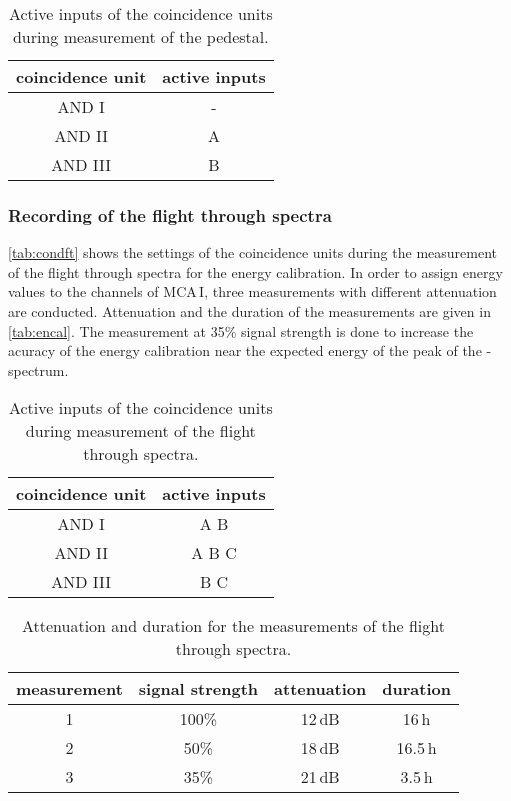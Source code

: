 \begin{table}[H]
\caption{Active inputs of the coincidence units during measurement of the pedestal.}
\begin{center}
\begin{tabular}{|c|c|}
  \hline
  coincidence unit	& active inputs	\\ \hline\hline
  AND I				& -				\\ \hline
  AND II			& A				\\ \hline
  AND III			& B				\\ \hline
 \end{tabular}
\end{center}
\label{tab:condped}
\end{table}

\subsubsection{Recording of the flight through spectra}
\autoref{tab:condft} shows the settings of the coincidence units during the measurement of the flight through spectra
for the energy calibration.
In order to assign energy values to the channels of MCA\,I,
three measurements with different attenuation are conducted.
Attenuation and the duration of the measurements are given in \autoref{tab:encal}.
The measurement at 35\% signal strength is done to increase the acuracy of the energy calibration near
the expected energy of the peak of the \textbeta-spectrum.

\begin{table}[H]
\caption{Active inputs of the coincidence units during measurement of the flight through spectra.}
\begin{center}
\begin{tabular}{|c|c|}
  \hline
  coincidence unit	& active inputs	\\ \hline\hline
  AND I				& A B			\\ \hline
  AND II			& A	B C			\\ \hline
  AND III			& B	C			\\ \hline
 \end{tabular}
\end{center}
\label{tab:condft}
\end{table}
\begin{table}[H]
\caption{Attenuation and duration for the measurements of the flight through spectra.}
\begin{center}
\begin{tabular}{|c|c|c|c|}
  \hline
  measurement	& signal strength	& attenuation	& duration	\\ \hline\hline
  1				& 100\%				& 12\,dB		& 16\,h		\\ \hline
  2				& 50\%				& 18\,dB		& 16.5\,h	\\ \hline
  3				& 35\%				& 21\,dB		& 3.5\,h	\\ \hline
 \end{tabular}
\end{center}
\label{tab:encal}
\end{table}

